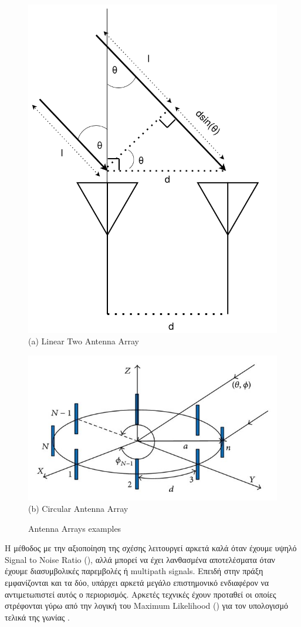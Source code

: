 \begin{figure} [H]
	\centering
    \begin{minipage}{.5\textwidth}
      \centering
      \includegraphics[width=0.5\linewidth]{../Photos/aoa-2antennas.png}\\
      {(a) Linear Two Antenna Array}
    \end{minipage}%
    \begin{minipage}{.5\textwidth}
      \centering
      \includegraphics[width=.7\linewidth]{Images/Theoretical-Background/The-antenna-array-geometry-a-linear-and-b-circular_W640.jpeg}\\
      {(b) Circular Antenna Array }
	\end{minipage}
    \hfill \break
    \decoRule
    \caption[Antenna Arrays examples]{Antenna Arrays examples}
    \label{fig:Antenna-Arrays}
\end{figure}

Η μέθοδος με την αξιοποίηση της σχέσης  λειτουργεί αρκετά καλά όταν έχουμε υψηλό Signal to Noise Ratio (),
αλλά μπορεί να έχει λανθασμένα αποτελέσματα όταν έχουμε διασυμβολικές παρεμβολές ή multipath signals. 
Επειδή στην πράξη εμφα\-νί\-ζονται και τα δύο, υπάρχει αρκετά μεγάλο επιστημονικό ενδιαφέρον να αντι\-με\-τω\-πι\-στεί αυτός ο περιορισμός.
Αρκετές τεχνικές έχουν προταθεί οι οποίες στρέφονται γύρω από την λογική του Maximum Likelihood ()
για τον υπολογισμό τελικά της γωνίας \cite{wsn-Localization-techniques}.

